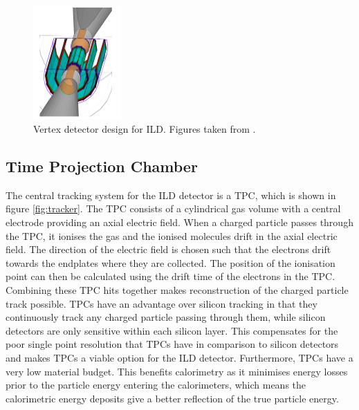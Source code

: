 \begin{figure}[h!]
\centering
\includegraphics[width=0.3\textwidth]{LCDetectorsAndPFlow/Plots/Pictures/Vertex3.png}
\caption[Vertex detector design for ILD.  Figures taken from \cite{arXiv:1006.3396}.]{Vertex detector design for ILD.  Figures taken from \cite{arXiv:1006.3396}.}
\label{fig:vertexpicture}
\end{figure} 


\subsection{Time Projection Chamber}
The central tracking system for the ILD detector is a TPC, which is shown in figure \ref{fig:tracker}.  The TPC consists of a cylindrical gas volume with a central electrode providing an axial electric field.  When a charged particle passes through the TPC, it ionises the gas and the ionised molecules drift in the axial electric field.  The direction of the electric field is chosen such that the electrons drift towards the endplates where they are collected.  The position of the ionisation point can then be calculated using the drift time of the electrons in the TPC.  Combining these TPC hits together makes reconstruction of the charged particle track possible.  TPCs have an advantage over silicon tracking in that they continuously track any charged particle passing through them, while silicon detectors are only sensitive within each silicon layer.  This compensates for the poor single point resolution that TPCs have in comparison to silicon detectors and makes TPCs a viable option for the ILD detector.  Furthermore, TPCs have a very low material budget.  This benefits calorimetry as it minimises energy losses prior to the particle energy entering the calorimeters, which means the calorimetric energy deposits give a better reflection of the true particle energy.  

